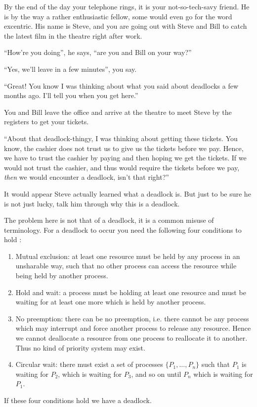 \documentclass[addpoints]{miunexam}
\begin{document}
\begin{questions}
  \question[5]\label{q:deadlock}
  By the end of the day your telephone rings, it is your not-so-tech-savy 
  friend.
  He is by the way a rather enthusiastic fellow, some would even go for the 
  word excentric.
  His name is Steve, and you are going out with Steve and Bill to catch the 
  latest film in the theatre right after work.

  ``How're you doing'', he says, ``are you and Bill on your way?''

  ``Yes, we'll leave in a few minutes'', you say.

  ``Great!  You know I was thinking about what you said about deadlocks a few 
  months ago.  I'll tell you when you get here.''

  You and Bill leave the office and arrive at the theatre to meet Steve by the 
  registers to get your tickets.

  ``About that deadlock-thingy, I was thinking about getting these tickets.
  You know, the cashier does not trust us to give us the tickets before we pay.
  Hence, we have to trust the cashier by paying and then hoping we get the 
  tickets.
  If we would not trust the cashier, and thus would require the tickets before 
  we pay, \emph{then} we would encounter a deadlock, isn't that right?''

  It would appear Steve actually learned what a deadlock is.
  But just to be sure he is not just lucky, talk him through why this is 
  a deadlock.
  \begin{solution}
    The problem here is not that of a deadlock, it is a common misuse of 
    terminology.
    For a deadlock to occur you need the following four conditions to hold 
    \cite[pp. 285--287]{Silberschatz2009osc}:
    \begin{enumerate}
      \item Mutual exclusion: at least one resource must be held by any process 
        in an unsharable way, such that no other process can access the 
        resource while being held by another process.
      \item Hold and wait: a process must be holding at least one resource and 
        must be waiting for at least one more which is held by another process.
      \item No preemption: there can be no preemption, i.e. there cannot be any 
        process which may interrupt and force another process to release any 
        resource.
        Hence we cannot deallocate a resource from one process to reallocate it 
        to another.
        Thus no kind of priority system may exist.
      \item Circular wait: there must exist a set of processes \(\{P_1, \ldots, 
        P_n\}\) such that \(P_1\) is waiting for \(P_2\), which is waiting for 
        \(P_3\), and so on until \(P_n\) which is waiting for \(P_1\).
    \end{enumerate}
    If these four conditions hold we have a deadlock.


\end{solution}
\end{questions}
\end{document}
